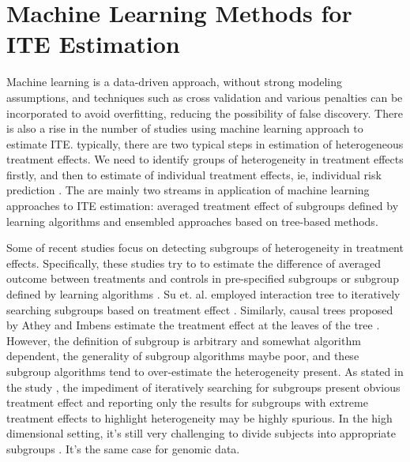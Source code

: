   \section{Machine Learning Methods for ITE Estimation}
    Machine learning is a data-driven approach, without strong modeling assumptions, and techniques such as cross validation and various penalties can be incorporated to avoid overfitting, reducing the possibility of false discovery. There is also a rise in the number of studies using machine learning approach to estimate ITE. typically, there are two typical steps in estimation of heterogeneous treatment effects. We need to identify groups of heterogeneity in treatment effects firstly, and then to estimate of individual treatment effects, ie, individual risk prediction \cite{scarpa2019assessment}. The are mainly two streams in application of machine learning approaches to ITE estimation: averaged treatment effect of subgroups defined by learning algorithms and ensembled approaches based on tree-based methods.
    
    Some of recent studies focus on detecting subgroups of heterogeneity in treatment effects. Specifically, these studies try to to estimate the difference of averaged outcome between treatments and controls in pre-specified subgroups \cite{gail1985testing} or subgroup defined by learning algorithms \cite{su2009subgroup, su2011interaction, athey2016recursive,foster2011subgroup, lipkovich2011subgroup}. Su et. al. employed interaction tree to iteratively searching subgroups based on treatment effect \cite{su2009subgroup,su2011interaction}. Similarly, causal trees proposed by Athey and Imbens estimate the treatment effect at the leaves of the tree \cite{athey2016recursive}. However, the definition of subgroup is arbitrary and somewhat algorithm dependent, the generality of subgroup algorithms maybe poor, and these subgroup algorithms tend to over-estimate the heterogeneity present. As stated in the study \cite{wager2018estimation}, the impediment of iteratively searching for subgroups present obvious treatment effect and reporting only the results for subgroups with extreme treatment effects to highlight heterogeneity may be highly spurious. In the high dimensional setting, it's still very challenging to divide subjects into appropriate subgroups \cite{powers2017some}. It's the same case for genomic data. 

